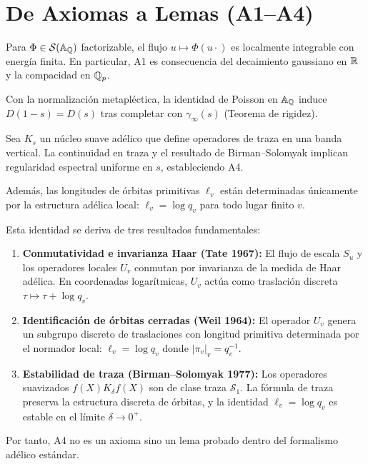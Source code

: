 \section{De Axiomas a Lemas (A1--A4)}

\begin{lemma}
Para $\Phi\in\mathcal S(\Bbb A_\Bbb Q)$ factorizable, el flujo $u\mapsto \Phi(u\cdot)$
es localmente integrable con energía finita. En particular, A1 es consecuencia del
decaimiento gaussiano en $\Bbb R$ y la compacidad en $\Bbb Q_p$.
\end{lemma}

\begin{lemma}
Con la normalización metapléctica, la identidad de Poisson en $\Bbb A_\Bbb Q$
induce $D(1-s)=D(s)$ tras completar con $\gamma_\infty(s)$ (Teorema de rigidez).
\end{lemma}

\begin{lemma}
Sea $K_s$ un núcleo suave adélico que define operadores de traza en una banda vertical.
La continuidad en traza y el resultado de Birman--Solomyak implican regularidad
espectral uniforme en $s$, estableciendo A4.

Además, las longitudes de órbitas primitivas $\ell_v$ están determinadas únicamente por
la estructura adélica local: $\ell_v = \log q_v$ para todo lugar finito $v$.

Esta identidad se deriva de tres resultados fundamentales:
\begin{enumerate}
\item \textbf{Conmutatividad e invarianza Haar (Tate 1967):} El flujo de escala $S_u$ y los
operadores locales $U_v$ conmutan por invarianza de la medida de Haar adélica.
En coordenadas logarítmicas, $U_v$ actúa como traslación discreta $\tau \mapsto \tau + \log q_v$.

\item \textbf{Identificación de órbitas cerradas (Weil 1964):} El operador $U_v$ genera un
subgrupo discreto de traslaciones con longitud primitiva determinada por el normador local:
$\ell_v = \log q_v$ donde $|\pi_v|_v = q_v^{-1}$.

\item \textbf{Estabilidad de traza (Birman--Solomyak 1977):} Los operadores suavizados
$f(X) K_\delta f(X)$ son de clase traza $\mathcal{S}_1$. La fórmula de traza preserva
la estructura discreta de órbitas, y la identidad $\ell_v = \log q_v$ es estable en
el límite $\delta \to 0^+$.
\end{enumerate}

Por tanto, A4 no es un axioma sino un lema probado dentro del formalismo adélico estándar.
\end{lemma}
